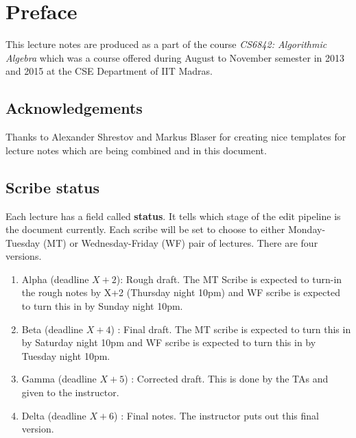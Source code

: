 \chapter*{Preface}

This lecture notes are produced as a part of the course \textit{CS6842: Algorithmic Algebra} which was a course offered during August to November semester in 2013 and 2015 at the CSE Department of IIT Madras.

\section*{Acknowledgements}
Thanks to Alexander Shrestov and Markus Blaser for creating nice templates for lecture notes which are being combined and in this document.

\section*{Scribe status}
Each lecture has a field called {\bf status}. It tells which stage of the edit
pipeline is the document currently. Each scribe will be set to choose to
either Monday-Tuesday (MT) or Wednesday-Friday (WF) pair of lectures.
There are four versions.
\begin{enumerate}
	\item Alpha (deadline $X+2$): Rough draft. The MT Scribe is expected
		to turn-in the rough notes by X+2 (Thursday night 10pm) and WF
		scribe is expected to turn this in by Sunday night 10pm.
	\item Beta (deadline $X+4$) : Final draft. The MT scribe is expected
		to turn this in by Saturday night 10pm and WF scribe is
		expected to turn this in by Tuesday night 10pm.
	\item Gamma (deadline $X+5$) : Corrected draft. This is done by the
		TAs and given to the instructor.
	\item Delta (deadline $X+6$) : Final notes. The instructor puts out 
		this final version.
\end{enumerate}
